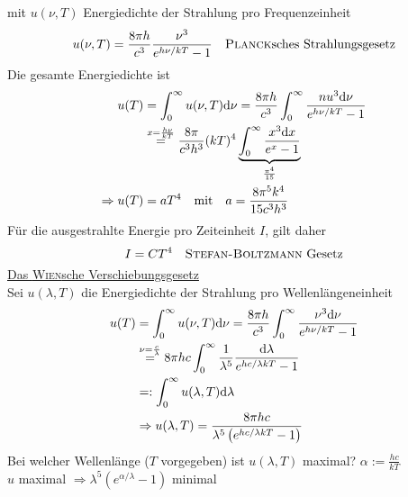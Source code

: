 \begin{enumerate}[A)]
    mit $u(\nu, T)$ Energiedichte der Strahlung pro Frequenzeinheit
    \begin{equation}
        u(\nu, T) = \frac{8 \pi h}{c^3} \frac{\nu^3}{e^{h \nu / k T} - 1} \quad \text{\textsc{Planck}sches Strahlungsgesetz}
    \end{equation}
    Die gesamte Energiedichte ist
    \begin{equation}
        \begin{split}
            u(T) &= \int_0^\infty u(\nu, T) \mathrm{d} \nu = \frac{8 \pi h}{c^3} \int_0^\infty \frac{nu^3 \mathrm{d} \nu}{e^{h \nu / k T} - 1} \\
            &\overset{x = \frac{h \nu}{k T}}{=} \frac{8 \pi}{c^3 h^3} (k T)^{4} \underbrace{\int_0^\infty \frac{x^3 \mathrm{d} x}{e^x - 1}}_{\frac{\pi^4}{15}} \\
            \Rightarrow u(T) &= a T^4 \quad \text{mit} \quad a = \frac{8 \pi^5 k^4}{15 c^3 h^3}
        \end{split}
    \end{equation}
    Für die ausgestrahlte Energie pro Zeiteinheit $I$, gilt daher
    \begin{equation}
        I = C T^4 \quad \text{\textsc{Stefan-Boltzmann} Gesetz}
    \end{equation}
    \underline{Das \textsc{Wien}sche Verschiebungsgesetz}\\
    Sei $u(\lambda, T)$ die Energiedichte der Strahlung pro Wellenlängeneinheit
    \begin{equation}
        \begin{split}
            u(T) &= \int_0^\infty u(\nu, T) \mathrm{d} \nu = \frac{8 \pi h}{c^3} \int_0^\infty \frac{\nu^3 \mathrm{d} \nu}{e^{h \nu / k T} - 1} \\
            &\overset{\nu = \frac{c}{\lambda}}{=} 8 \pi h c \int_0^\infty \frac{1}{\lambda^5} \frac{\mathrm{d} \lambda}{e^{h c / \lambda k T} - 1} \\
            &=: \int_0^\infty u(\lambda, T) \mathrm{d} \lambda \\
            & \Rightarrow u(\lambda, T) = \frac{8 \pi h c}{\lambda^5 \left( e^{h c / \lambda k T} - 1 \right)}
        \end{split}
    \end{equation}
    Bei welcher Wellenlänge ($T$ vorgegeben) ist $u(\lambda, T)$ maximal? $\alpha := \frac{h c}{k T}$ \\
    $u$ maximal $\Rightarrow \lambda^5 \left( e^{\alpha / \lambda} - 1 \right) $ minimal
    \begin{equation}
        \begin{split}

\end{split}
\end{equation}
\end{enumerate}
